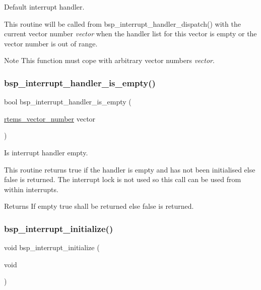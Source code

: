 Default interrupt handler. 

This routine will be called from bsp\+\_\+interrupt\+\_\+handler\+\_\+dispatch() with the current vector number {\itshape vector} when the handler list for this vector is empty or the vector number is out of range.

\begin{DoxyNote}{Note}
This function must cope with arbitrary vector numbers {\itshape vector}. 
\end{DoxyNote}
\mbox{\label{group__bsp__interrupt_ga0ab406af223fad2abc336b84597c7008}} 
\subsubsection{\texorpdfstring{bsp\_interrupt\_handler\_is\_empty()}{bsp\_interrupt\_handler\_is\_empty()}}
{\footnotesize\ttfamily bool bsp\+\_\+interrupt\+\_\+handler\+\_\+is\+\_\+empty (\begin{DoxyParamCaption}\item[{\mbox{\hyperlink{group__ClassicINTR_ga3e434c197d99f128e78cae4d9358bd8b}{rtems\+\_\+vector\+\_\+number}}}]{vector }\end{DoxyParamCaption})}



Is interrupt handler empty. 

This routine returns true if the handler is empty and has not been initialised else false is returned. The interrupt lock is not used so this call can be used from within interrupts.

\begin{DoxyReturn}{Returns}
If empty true shall be returned else false is returned. 
\end{DoxyReturn}
\mbox{\label{group__bsp__interrupt_gafccb8719531b51a8cf0163febeb42b29}} 
\subsubsection{\texorpdfstring{bsp\_interrupt\_initialize()}{bsp\_interrupt\_initialize()}}
{\footnotesize\ttfamily void bsp\+\_\+interrupt\+\_\+initialize (\begin{DoxyParamCaption}\item[{void}]{ }\end{DoxyParamCaption})}



